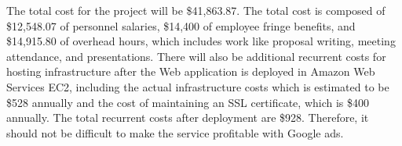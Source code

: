 
The total cost for the project will be \$41,863.87. The total cost is composed
of \$12,548.07 of personnel salaries, \$14,400 of employee fringe benefits, and
\$14,915.80 of overhead hours, which includes work like proposal writing,
meeting attendance, and presentations. There will also be additional recurrent
costs for hosting infrastructure after the Web application is deployed in
Amazon Web Services EC2, including the actual infrastructure costs which is
estimated to be \$528 annually and the cost of maintaining an SSL certificate,
which is \$400 annually. The total recurrent costs after deployment are \$928.
Therefore, it should not be difficult to make the service profitable with
Google ads.

